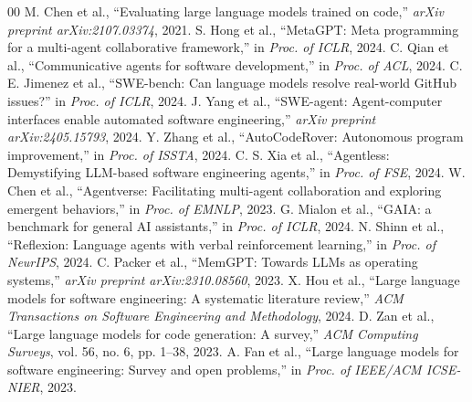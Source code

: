 \documentclass[conference]{IEEEtran}
\begin{document}

\begin{thebibliography}{00}
 M. Chen et al., ``Evaluating large language models trained on code,'' \textit{arXiv preprint arXiv:2107.03374}, 2021.
 S. Hong et al., ``MetaGPT: Meta programming for a multi-agent collaborative framework,'' in \textit{Proc. of ICLR}, 2024.
 C. Qian et al., ``Communicative agents for software development,'' in \textit{Proc. of ACL}, 2024.
 C. E. Jimenez et al., ``SWE-bench: Can language models resolve real-world GitHub issues?'' in \textit{Proc. of ICLR}, 2024.
 J. Yang et al., ``SWE-agent: Agent-computer interfaces enable automated software engineering,'' \textit{arXiv preprint arXiv:2405.15793}, 2024.
 Y. Zhang et al., ``AutoCodeRover: Autonomous program improvement,'' in \textit{Proc. of ISSTA}, 2024.
 C. S. Xia et al., ``Agentless: Demystifying LLM-based software engineering agents,'' in \textit{Proc. of FSE}, 2024.
 W. Chen et al., ``Agentverse: Facilitating multi-agent collaboration and exploring emergent behaviors,'' in \textit{Proc. of EMNLP}, 2023.
 G. Mialon et al., ``GAIA: a benchmark for general AI assistants,'' in \textit{Proc. of ICLR}, 2024.
 N. Shinn et al., ``Reflexion: Language agents with verbal reinforcement learning,'' in \textit{Proc. of NeurIPS}, 2024.
 C. Packer et al., ``MemGPT: Towards LLMs as operating systems,'' \textit{arXiv preprint arXiv:2310.08560}, 2023.
 X. Hou et al., ``Large language models for software engineering: A systematic literature review,'' \textit{ACM Transactions on Software Engineering and Methodology}, 2024.
 D. Zan et al., ``Large language models for code generation: A survey,'' \textit{ACM Computing Surveys}, vol. 56, no. 6, pp. 1--38, 2023.
 A. Fan et al., ``Large language models for software engineering: Survey and open problems,'' in \textit{Proc. of IEEE/ACM ICSE-NIER}, 2023.
\end{thebibliography}
\end{document}
